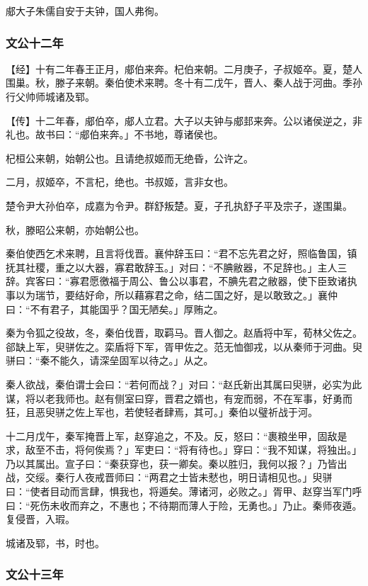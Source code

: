 \documentclass[]{article}
\begin{document}
郕大子朱儒自安于夫钟，国人弗徇。

\hypertarget{header-n1184}{%
\subsubsection{文公十二年}\label{header-n1184}}

【经】十有二年春王正月，郕伯来奔。杞伯来朝。二月庚子，子叔姬卒。夏，楚人围巢。秋，滕子来朝。秦伯使术来聘。冬十有二戊午，晋人、秦人战于河曲。季孙行父帅师城诸及郓。

【传】十二年春，郕伯卒，郕人立君。大子以夫钟与郕邽来奔。公以诸侯逆之，非礼也。故书曰：``郕伯来奔。」不书地，尊诸侯也。

杞桓公来朝，始朝公也。且请绝叔姬而无绝昏，公许之。

二月，叔姬卒，不言杞，绝也。书叔姬，言非女也。

楚令尹大孙伯卒，成嘉为令尹。群舒叛楚。夏，子孔执舒子平及宗子，遂围巢。

秋，滕昭公来朝，亦始朝公也。

秦伯使西乞术来聘，且言将伐晋。襄仲辞玉曰：``君不忘先君之好，照临鲁国，镇抚其社稷，重之以大器，寡君敢辞玉。」对曰：``不腆敝器，不足辞也。」主人三辞。宾客曰：``寡君愿徼福于周公、鲁公以事君，不腆先君之敝器，使下臣致诸执事以为瑞节，要结好命，所以藉寡君之命，结二国之好，是以敢致之。」襄仲曰：``不有君子，其能国乎？国无陋矣。」厚贿之。

秦为令狐之役故，冬，秦伯伐晋，取羁马。晋人御之。赵盾将中军，荀林父佐之。郤缺上军，臾骈佐之。栾盾将下军，胥甲佐之。范无恤御戎，以从秦师于河曲。臾骈曰：``秦不能久，请深垒固军以待之。」从之。

秦人欲战，秦伯谓士会曰：``若何而战？」对曰：``赵氏新出其属曰臾骈，必实为此谋，将以老我师也。赵有侧室曰穿，晋君之婿也，有宠而弱，不在军事，好勇而狂，且恶臾骈之佐上军也，若使轻者肆焉，其可。」秦伯以璧祈战于河。

十二月戊午，秦军掩晋上军，赵穿追之，不及。反，怒曰：``裹粮坐甲，固敌是求，敌至不击，将何俟焉？」军吏曰：``将有待也。」穿曰：``我不知谋，将独出。」乃以其属出。宣子曰：``秦获穿也，获一卿矣。秦以胜归，我何以报？」乃皆出战，交绥。秦行人夜戒晋师曰：``两君之士皆未憖也，明日请相见也。」臾骈曰：``使者目动而言肆，惧我也，将遁矣。薄诸河，必败之。」胥甲、赵穿当军门呼曰：``死伤未收而弃之，不惠也；不待期而薄人于险，无勇也。」乃止。秦师夜遁。复侵晋，入瑕。

城诸及郓，书，时也。

\hypertarget{header-n1198}{%
\subsubsection{文公十三年}\label{header-n1198}}
\end{document}
